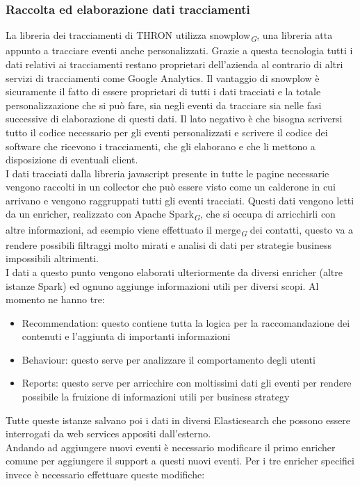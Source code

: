 \documentclass[a4paper, 12pt, twoside, openright]{book}
\newcommand{\gloss}[1]{#1\textsubscript{\textit{\tiny{G}}}}
\begin{document}
\subsubsection{Raccolta ed elaborazione dati tracciamenti}
La libreria dei tracciamenti di THRON utilizza \gloss{snowplow}, una libreria atta appunto a tracciare eventi anche personalizzati. Grazie a questa tecnologia tutti i dati relativi ai tracciamenti restano proprietari dell'azienda al contrario di altri servizi di tracciamenti come Google Analytics. Il vantaggio di snowplow è sicuramente il fatto di essere proprietari di tutti i dati tracciati e la totale personalizzazione che si può fare, sia negli eventi da tracciare sia nelle fasi successive di elaborazione di questi dati. Il lato negativo è che bisogna scriversi tutto il codice necessario per gli eventi personalizzati e scrivere il codice dei software che ricevono i tracciamenti, che gli elaborano e che li mettono a disposizione di eventuali client.\\
I dati tracciati dalla libreria javascript presente in tutte le pagine necessarie vengono raccolti in un collector che può essere visto come un calderone in cui arrivano e vengono raggruppati tutti gli eventi tracciati.
Questi dati vengono letti da un enricher, realizzato con \gloss{Apache Spark}, che si occupa di arricchirli con altre informazioni, ad esempio viene effettuato il \gloss{merge} dei contatti, questo va a rendere possibili filtraggi molto mirati e analisi di dati per strategie business impossibili altrimenti.\\
I dati a questo punto vengono elaborati ulteriormente da diversi enricher (altre istanze Spark) ed ognuno aggiunge informazioni utili per diversi scopi. Al momento ne hanno tre:
\begin{itemize}
\item Recommendation: questo contiene tutta la logica per la raccomandazione dei contenuti e l'aggiunta di importanti informazioni
\item Behaviour: questo serve per analizzare il comportamento degli utenti 
\item Reports: questo serve per arricchire con moltissimi dati gli eventi per rendere possibile la fruizione di informazioni utili per business strategy
\end{itemize}
Tutte queste istanze salvano poi i dati in diversi Elasticsearch che possono essere interrogati da web services appositi dall'esterno.\\
Andando ad aggiungere nuovi eventi è necessario modificare il primo enricher comune per aggiungere il support a questi nuovi eventi. Per i tre enricher specifici invece è necessario effettuare queste modifiche:
\end{document}
